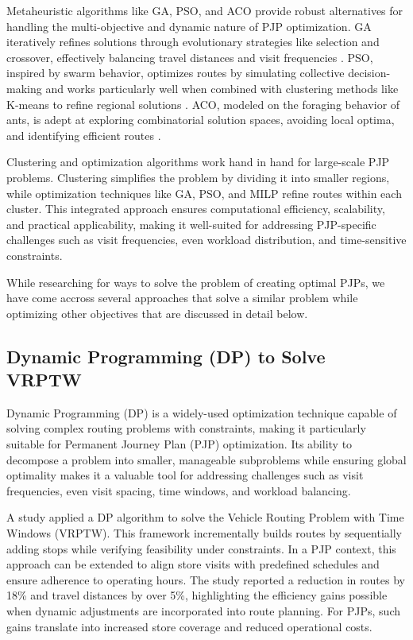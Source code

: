 Metaheuristic algorithms like GA, PSO, and ACO provide robust alternatives for handling the multi-objective and dynamic nature of PJP optimization. GA iteratively refines solutions through evolutionary strategies like selection and crossover, effectively balancing travel distances and visit frequencies \cite{Konak_Coit_Smith_2006}. PSO, inspired by swarm behavior, optimizes routes by simulating collective decision-making and works particularly well when combined with clustering methods like K-means to refine regional solutions \cite{Hughes_Goerigk_Dokka_2020}. ACO, modeled on the foraging behavior of ants, is adept at exploring combinatorial solution spaces, avoiding local optima, and identifying efficient routes \cite{articleACO}.

Clustering and optimization algorithms work hand in hand for large-scale PJP problems. Clustering simplifies the problem by dividing it into smaller regions, while optimization techniques like GA, PSO, and MILP refine routes within each cluster. This integrated approach ensures computational efficiency, scalability, and practical applicability, making it well-suited for addressing PJP-specific challenges such as visit frequencies, even workload distribution, and time-sensitive constraints.

While researching for ways to solve the problem of creating optimal PJPs, we have come accross several approaches that solve a similar problem while optimizing other objectives that are discussed in detail below.

\subsection{Dynamic Programming (DP) to Solve VRPTW}
Dynamic Programming (DP) is a widely-used optimization technique capable of solving complex routing problems with constraints, making it particularly suitable for Permanent Journey Plan (PJP) optimization. Its ability to decompose a problem into smaller, manageable subproblems while ensuring global optimality makes it a valuable tool for addressing challenges such as visit frequencies, even visit spacing, time windows, and workload balancing.

A study \cite{articleDP} applied a DP algorithm to solve the Vehicle Routing Problem with Time Windows (VRPTW). This framework incrementally builds routes by sequentially adding stops while verifying feasibility under constraints. In a PJP context, this approach can be extended to align store visits with predefined schedules and ensure adherence to operating hours. The study reported a reduction in routes by 18\% and travel distances by over 5\%, highlighting the efficiency gains possible when dynamic adjustments are incorporated into route planning. For PJPs, such gains translate into increased store coverage and reduced operational costs.

